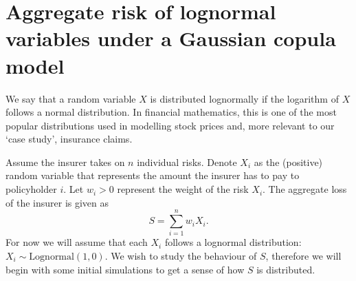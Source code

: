 \documentclass{article}
\begin{document}
\section{Aggregate risk of lognormal variables under a Gaussian copula model}

We say that a random variable $X$ is distributed lognormally if the logarithm of $X$ follows a normal distribution.
In financial mathematics, this is one of the most popular distributions used in modelling stock prices and, more relevant to our `case study', insurance claims. 

Assume the insurer takes on $n$ individual risks. Denote $X_i$ as the (positive) random variable that represents the amount the insurer has to pay to policyholder $i$. Let $w_i > 0$ represent the weight of the risk $X_i$. The aggregate loss of the insurer is given as
$$S = \sum_{i=1}^nw_iX_i.$$
For now we will assume that each $X_i$ follows a lognormal distribution: $X_i\sim \text{Lognormal}(1,0)$. We wish to study the behaviour of $S$, therefore we will begin with some initial simulations to get a sense of how $S$ is distributed.
\end{document}
